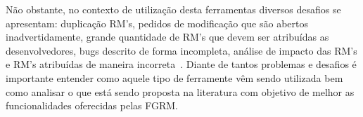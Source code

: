 Não obstante, no contexto de utilização desta ferramentas diversos desafios se apresentam:
duplicação RM's, pedidos de modificação que são abertos inadvertidamente, grande quantidade de RM's
que devem ser atribuídas as desenvolvedores, bugs descrito de forma incompleta, análise de
impacto das RM's e RM's atribuídas de maneira incorreta~\cite{cavalcanti2014challenges}.  Diante de
tantos problemas e desafios é importante entender como aquele tipo de ferramente vêm sendo utilizada
bem como analisar o que está sendo proposta na literatura com objetivo de melhor as funcionalidades
oferecidas pelas FGRM.
%
%
%
%
%

